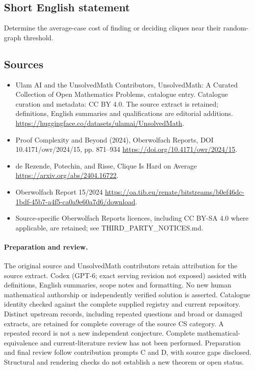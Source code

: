 \documentclass[11pt]{article}
\begin{document}
\subsection{Short English statement}
Determine the average-case cost of finding or deciding cliques near their random-graph threshold.
\subsection{Sources}
\begin{itemize}
\item[\hypertarget{source:statement:1}{S1}] Ulam AI and the UnsolvedMath Contributors, UnsolvedMath: A Curated Collection of Open Mathematics Problems, catalogue entry. Catalogue curation and metadata: CC BY 4.0. The source extract is retained; definitions, English summaries and qualifications are editorial additions.
\url{https://huggingface.co/datasets/ulamai/UnsolvedMath}.
\item[\hypertarget{source:statement:2}{S2}] Proof Complexity and Beyond (2024), Oberwolfach Reports, DOI 10.4171/owr/2024/15, pp. 871--934
\url{https://doi.org/10.4171/owr/2024/15}.
\item[\hypertarget{source:statement:3}{S3}] de Rezende, Potechin, and Risse, Clique Is Hard on Average
\url{https://arxiv.org/abs/2404.16722}.
\item[\hypertarget{source:statement:4}{S4}] Oberwolfach Report 15/2024
\url{https://oa.tib.eu/renate/bitstreams/b0ef46dc-1bdf-45b7-a4f5-ca0a9e60a7d6/download}.
\item Source-specific Oberwolfach Reports licences, including CC BY-SA 4.0 where applicable, are retained; see THIRD\_PARTY\_NOTICES.md.
\end{itemize}
\paragraph{Preparation and review.}
The original source and UnsolvedMath contributors retain attribution for the source extract. Codex (GPT-6; exact serving revision not exposed) assisted with definitions, English summaries, scope notes and formatting. No new human mathematical authorship or independently verified solution is asserted. Catalogue identity checked against the complete supplied registry and current repository. Distinct upstream records, including repeated questions and broad or damaged extracts, are retained for complete coverage of the source CS category. A repeated record is not a new independent conjecture. Complete mathematical-equivalence and current-literature review has not been performed. Preparation and final review follow contribution prompts C and D, with source gaps disclosed. Structural and rendering checks do not establish a new theorem or open status.
\label{end:statement}
\end{document}
